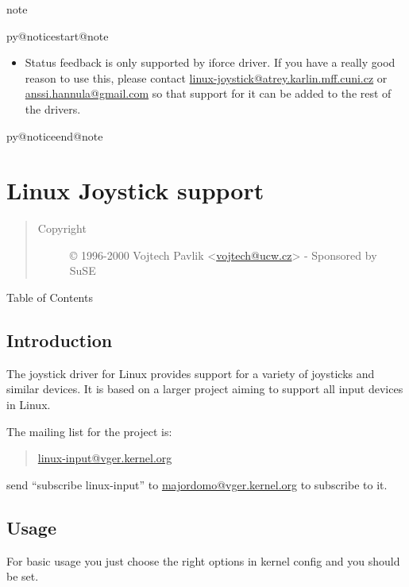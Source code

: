 \documentclass[a4paper,8pt,english]{sphinxmanual}
\makeatletter
\renewenvironment{notice}[2]{%
          \def\py@noticetype{#1}
          \begin{coloredbox}{#1}
          \bf\it
          \par\strong{#2}
          \csname py@noticestart@#1\endcsname
        }
	{
          \csname py@noticeend@\py@noticetype\endcsname
          \end{coloredbox}
        }
\makeatother
\begin{document}
\begin{notice}{note}{Note:}\begin{itemize}
\item {} 
Status feedback is only supported by iforce driver. If you have
a really good reason to use this, please contact
\href{mailto:linux-joystick@atrey.karlin.mff.cuni.cz}{linux-joystick@atrey.karlin.mff.cuni.cz} or \href{mailto:anssi.hannula@gmail.com}{anssi.hannula@gmail.com}
so that support for it can be added to the rest of the drivers.

\end{itemize}
\end{notice}


\section{Linux Joystick support}
\label{input/joydev/index::doc}\label{input/joydev/index:linux-joystick-support}\begin{quote}\begin{description}
\item[{Copyright}] \leavevmode
© 1996-2000 Vojtech Pavlik \textless{}\href{mailto:vojtech@ucw.cz}{vojtech@ucw.cz}\textgreater{} - Sponsored by SuSE

\end{description}\end{quote}

Table of Contents


\subsection{Introduction}
\label{input/joydev/joystick:introduction}\label{input/joydev/joystick::doc}\label{input/joydev/joystick:joystick-doc}
The joystick driver for Linux provides support for a variety of joysticks
and similar devices. It is based on a larger project aiming to support all
input devices in Linux.

The mailing list for the project is:
\begin{quote}

\href{mailto:linux-input@vger.kernel.org}{linux-input@vger.kernel.org}
\end{quote}

send ``subscribe linux-input'' to \href{mailto:majordomo@vger.kernel.org}{majordomo@vger.kernel.org} to subscribe to it.


\subsection{Usage}
\label{input/joydev/joystick:usage}
For basic usage you just choose the right options in kernel config and
you should be set.
\end{document}
